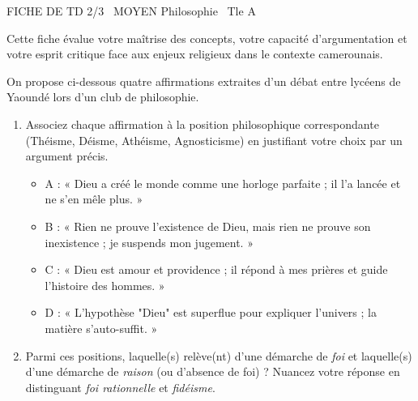\documentclass[11pt]{article}
\begin{document}
\begin{tcolorbox}[enhanced,colback=popink,colframe=popink,arc=10pt,boxrule=0pt,left=12pt,right=12pt,top=9pt,bottom=9pt]
{\color{white}\popxbold\small FICHE DE TD 2/3 \textbullet\ MOYEN \hfill Philosophie \textbullet\ Tle A\par}
\end{tcolorbox}
\vspace{4pt}
Cette fiche évalue votre maîtrise des concepts, votre capacité d'argumentation et votre esprit critique face aux enjeux religieux dans le contexte camerounais.

\begin{exercice}
On propose ci-dessous quatre affirmations extraites d'un débat entre lycéens de Yaoundé lors d'un club de philosophie.

\begin{enumerate}
    \item Associez chaque affirmation à la position philosophique correspondante (Théisme, Déisme, Athéisme, Agnosticisme) en justifiant votre choix par un argument précis.
    \begin{itemize}
        \item A : « Dieu a créé le monde comme une horloge parfaite ; il l'a lancée et ne s'en mêle plus. »
        \item B : « Rien ne prouve l'existence de Dieu, mais rien ne prouve son inexistence ; je suspends mon jugement. »
        \item C : « Dieu est amour et providence ; il répond à mes prières et guide l'histoire des hommes. »
        \item D : « L'hypothèse "Dieu" est superflue pour expliquer l'univers ; la matière s'auto-suffit. »
    \end{itemize}
    \item Parmi ces positions, laquelle(s) relève(nt) d'une démarche de \textit{foi} et laquelle(s) d'une démarche de \textit{raison} (ou d'absence de foi) ? Nuancez votre réponse en distinguant \textit{foi rationnelle} et \textit{fidéisme}.
\end{enumerate}
\end{exercice}
\end{document}
